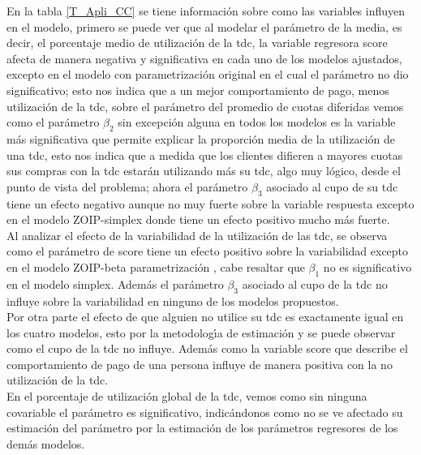 En la tabla \ref{T_Apli_CC} se tiene informaci\'{o}n sobre como las variables influyen en el modelo, primero se puede ver que al modelar el par\'{a}metro de la media, es decir, el porcentaje medio de utilizaci\'{o}n de la tdc, la variable regresora score afecta de manera negativa y significativa en cada uno de los modelos ajustados, excepto en el mo\-de\-lo con parametrizaci\'{o}n original en el cual el par\'{a}metro no dio significativo; esto nos indica que a un mejor comportamiento de pago, menos utilizaci\'{o}n de la tdc, sobre el par\'{a}metro del promedio de cuotas diferidas vemos como el par\'{a}metro $\beta_2$ sin excepci\'{o}n alguna en todos los modelos es la variable m\'{a}s significativa que permite explicar la proporci\'{o}n media de la utilizaci\'{o}n de una tdc, esto nos indica que a medida que los clientes difieren a mayores cuotas sus compras con la tdc estar\'{a}n utilizando m\'{a}s su tdc, algo muy l\'{o}gico, desde el punto de vista del problema; ahora el par\'{a}metro $\beta_3$ asociado al cupo de su tdc tiene un efecto negativo aunque no muy fuerte sobre la variable respuesta excepto en el modelo ZOIP-simplex donde tiene un efecto positivo mucho m\'{a}s fuerte.\\

Al analizar el efecto de la variabilidad de la utilizaci\'{o}n de las tdc, se observa como el par\'{a}metro de score tiene un efecto positivo sobre la variabilidad excepto en el modelo ZOIP-beta parametrizaci\'{o}n \cite{Stasinopoulos2}, cabe resaltar que $\beta_1$ no es significativo en el modelo simplex. Adem\'{a}s el par\'{a}metro $\beta_3$ asociado al cupo de la tdc no influye sobre la variabilidad en ninguno de los modelos propuestos.\\

Por otra parte el efecto de que alguien no utilice su tdc es exactamente igual en los cuatro modelos, esto por la metodolog\'{\i}a de estimaci\'{o}n y se puede observar como el cupo de la tdc no influye. Adem\'{a}s como la variable score que describe el comportamiento de pago de una persona influye de manera positiva con la no utilizaci\'{o}n de la tdc.\\

En el porcentaje de utilizaci\'{o}n global de la tdc, vemos como sin ninguna covariable el par\'{a}metro es significativo, indic\'{a}ndonos como no se ve afectado su estimaci\'{o}n del par\'{a}metro por la estimaci\'{o}n de los par\'{a}metros regresores de los dem\'{a}s modelos.\\

